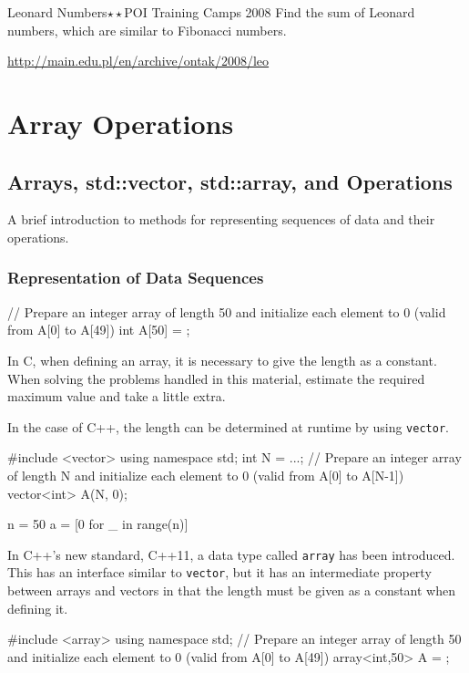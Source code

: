 \begin{pbox}{Leonard Numbers$\star\star$}{POI Training Camps 2008}
Find the sum of Leonard numbers, which are similar to Fibonacci numbers.
  
\url{http://main.edu.pl/en/archive/ontak/2008/leo}
\end{pbox}

\chapter{Array Operations}
\section{Arrays, std::vector, std::array, and Operations}

A brief introduction to methods for representing sequences of data and their operations.

\subsection{Representation of Data Sequences}

\begin{cbox}
  // Prepare an integer array of length 50 and initialize each element to 0 (valid from A[0] to A[49])
  int A[50] = {}; 
\end{cbox}

In C, when defining an array, it is necessary to give the length as a constant. When solving the problems handled in this material, estimate the required maximum value and take a little extra.

In the case of C++, the length can be determined at runtime by using \texttt{vector}.
\begin{cbox}[emph={vector}]
#include <vector>
using namespace std;
  int N = ...;
  // Prepare an integer array of length N and initialize each element to 0 (valid from A[0] to A[N-1])
  vector<int> A(N, 0);
\end{cbox}

\begin{pybox}
n = 50
a = [0 for _ in range(n)]
\end{pybox}

In C++'s new standard, C++11, a data type called \texttt{array} has been introduced. This has an interface similar to \texttt{vector}, but it has an intermediate property between arrays and vectors in that the length must be given as a constant when defining it.
\begin{c11box}[emph={array}]
#include <array>
using namespace std;
  // Prepare an integer array of length 50 and initialize each element to 0 (valid from A[0] to A[49])
  array<int,50> A = {}; 
\end{c11box}

